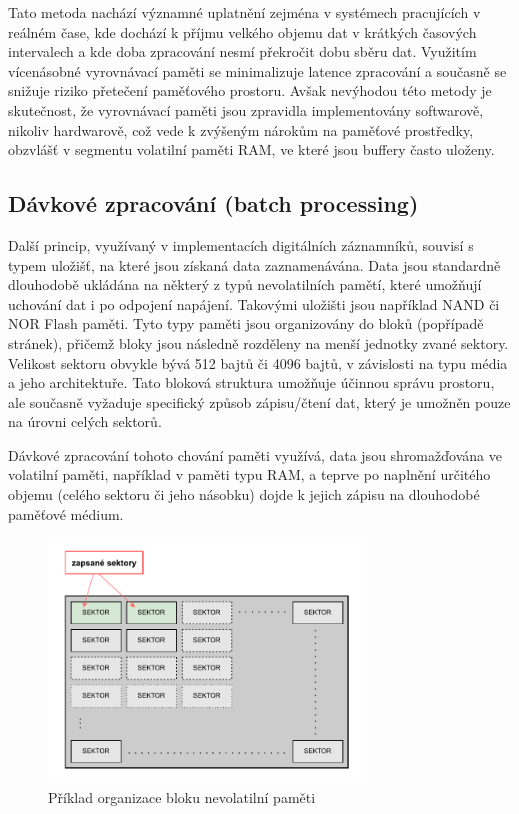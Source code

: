 Tato metoda nachází významné uplatnění zejména v systémech pracujících v reálném čase, kde dochází k příjmu velkého objemu dat v krátkých časových intervalech a kde doba zpracování nesmí překročit dobu sběru dat. Využitím vícenásobné vyrovnávací paměti se minimalizuje latence zpracování a současně se snižuje riziko přetečení paměťového prostoru. Avšak nevýhodou této metody je skutečnost, že vyrovnávací paměti jsou zpravidla implementovány softwarově, nikoliv hardwarově, což vede k zvýšeným nárokům na paměťové prostředky, obzvlášť v segmentu volatilní paměti RAM, ve které jsou buffery často uloženy. \cite{buffering_chang, basics_of_digital_forensics}

\subsection{Dávkové zpracování (batch processing)}
\label{davkove_zpracovani}
Další princip, využívaný v implementacích digitálních záznamníků, souvisí s typem uložišť, na které jsou získaná data zaznamenávána. Data jsou standardně dlouhodobě ukládána na některý z typů nevolatilních pamětí, které umožňují uchování dat i po odpojení napájení. Takovými uložišti jsou například NAND či NOR Flash paměti. Tyto typy paměti jsou organizovány do bloků (popřípadě stránek), přičemž bloky jsou následně rozděleny na menší jednotky zvané sektory. Velikost sektoru obvykle bývá 512 bajtů či 4096 bajtů, v závislosti na typu média a jeho architektuře. Tato bloková struktura umožňuje účinnou správu prostoru, ale současně vyžaduje specifický způsob zápisu/čtení dat, který je umožněn pouze na úrovni celých sektorů. \cite{tech_target_nand_flash, non_volatile_memories}

Dávkové zpracování tohoto chování paměti využívá, data jsou shromažďována ve volatilní paměti, například v paměti typu RAM, a teprve po naplnění určitého objemu (celého sektoru či jeho násobku) dojde k jejich zápisu na dlouhodobé paměťové médium.

\begin{figure}[h]
    \centering
    \includegraphics[width=0.75\textwidth]{obrazky-figures/batch_processing.pdf}
    
    \caption{Příklad organizace bloku nevolatilní paměti \cite{ieee_relationships_among_region_segment_frame_and_cluster}}
    \label{fig:batch-processing}
\end{figure}

